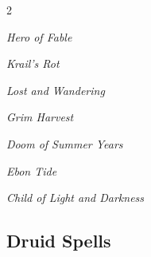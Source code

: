 \documentclass[10pt,a4paper,twoside,bg=print,twocolumn,openany,nodeprecatedcode]{dndbook}
\begin{document}
\begin{description}
\begin{multicols}{2}
{\par \vspace { 9pt plus 3pt minus 3pt } \noindent  {} \nopagebreak }

\begin{description}
\item \textit{Hero of Fable}
\item \textit{Krail's Rot}
\item \textit{Lost and Wandering}
\end{description}

{\par \vspace { 9pt plus 3pt minus 3pt } \noindent  {} \nopagebreak }

\begin{description}
\item \textit{Grim Harvest}
\end{description}

{\par \vspace { 9pt plus 3pt minus 3pt } \noindent  {} \nopagebreak }

\begin{description}
\item \textit{Doom of Summer Years}
\item \textit{Ebon Tide}
\end{description}

{\par \vspace { 9pt plus 3pt minus 3pt } \noindent  {} \nopagebreak }

\begin{description}
\item \textit{Child of Light and Darkness}
\end{description}

\end{multicols}

\end{description}

\subsection{Druid Spells}
\end{document}
